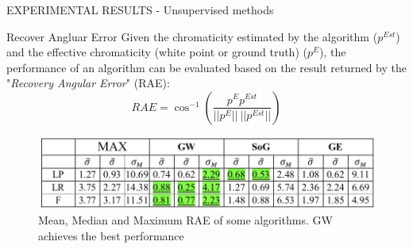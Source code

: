 \begin{frame}{EXPERIMENTAL RESULTS - Unsupervised methods}
    \begin{block}{Recover Angluar Error}
        Given the chromaticity estimated by the algorithm ($ p^{Est} $) and the 
        effective chromaticity (white point or ground truth) ($ p^E $), the 
        performance of an algorithm can be evaluated based on the result 
        returned by the "\emph{Recovery Angular Error}" (RAE):
        $$ RAE=\cos^{-1}\left(\frac{p^Ep^{Est}}{||p^E||~||p^{Est}||}\right) $$
    \end{block}
    \begin{figure}[htbp]
        \centering
        \includegraphics[width = 0.8 \linewidth]{images/paper4/standardHigh.png}
        \centering
        \caption{Mean, Median and Maximum RAE of some algorithms. GW  achieves the best performance}
        \label{fig:RAEstandard}
    \end{figure}
\end{frame}

